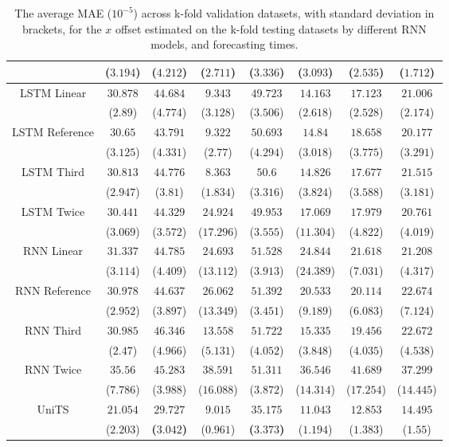 \begin{table}[!ht]
{\begin{tabular}{|c|c|c|c|c|c|c|c|}
			 & ($3.194$) & ($4.212$) & ($2.711$) & ($3.336$) & ($3.093$) & ($2.535$) & ($1.712$) \\ \hline
			\multirow{2}{*}{LSTM Linear} & $30.878$ & $44.684$ & $9.343$ & $49.723$ & $14.163$ & $17.123$ & $21.006$ \\
			 & ($2.89$) & ($4.774$) & ($3.128$) & ($3.506$) & ($2.618$) & ($2.528$) & ($2.174$) \\ \hline
			\multirow{2}{*}{LSTM Reference} & $30.65$ & $43.791$ & $9.322$ & $50.693$ & $14.84$ & $18.658$ & $20.177$ \\
			 & ($3.125$) & ($4.331$) & ($2.77$) & ($4.294$) & ($3.018$) & ($3.775$) & ($3.291$) \\ \hline
			\multirow{2}{*}{LSTM Third} & $30.813$ & $44.776$ & $8.363$ & $50.6$ & $14.826$ & $17.677$ & $21.515$ \\
			 & ($2.947$) & ($3.81$) & ($1.834$) & ($3.316$) & ($3.824$) & ($3.588$) & ($3.181$) \\ \hline
			\multirow{2}{*}{LSTM Twice} & $30.441$ & $44.329$ & $24.924$ & $49.953$ & $17.069$ & $17.979$ & $20.761$ \\
			 & ($3.069$) & ($3.572$) & ($17.296$) & ($3.555$) & ($11.304$) & ($4.822$) & ($4.019$) \\ \hline
			\multirow{2}{*}{RNN Linear} & $31.337$ & $44.785$ & $24.693$ & $51.528$ & $24.844$ & $21.618$ & $21.208$ \\
			 & ($3.114$) & ($4.409$) & ($13.112$) & ($3.913$) & ($24.389$) & ($7.031$) & ($4.317$) \\ \hline
			\multirow{2}{*}{RNN Reference} & $30.978$ & $44.637$ & $26.062$ & $51.392$ & $20.533$ & $20.114$ & $22.674$ \\
			 & ($2.952$) & ($3.897$) & ($13.349$) & ($3.451$) & ($9.189$) & ($6.083$) & ($7.124$) \\ \hline
			\multirow{2}{*}{RNN Third} & $30.985$ & $46.346$ & $13.558$ & $51.722$ & $15.335$ & $19.456$ & $22.672$ \\
			 & ($2.47$) & ($4.966$) & ($5.131$) & ($4.052$) & ($3.848$) & ($4.035$) & ($4.538$) \\ \hline
			\multirow{2}{*}{RNN Twice} & $35.56$ & $45.283$ & $38.591$ & $51.311$ & $36.546$ & $41.689$ & $37.299$ \\
			 & ($7.786$) & ($3.988$) & ($16.088$) & ($3.872$) & ($14.314$) & ($17.254$) & ($14.445$) \\ \hline
			\multirow{2}{*}{UniTS} & $21.054$ & $\mathbf{29.727}$ & $9.015$ & $\mathbf{35.175}$ & $11.043$ & $12.853$ & $14.495$ \\
			 & ($2.203$) & \textbf{(}$\mathbf{3.042}$\textbf{)} & ($0.961$) & \textbf{(}$\mathbf{3.373}$\textbf{)} & ($1.194$) & ($1.383$) & ($1.55$) \\ \hline
		\end{tabular}
	}
	\caption{The average MAE ($10^{-5}$) across k-fold validation datasets, with standard deviation in brackets, for the $x$ offset estimated on the k-fold testing datasets by different RNN models, and forecasting times.}
	\label{tab:all_longitude_no_abs_MAE}
\end{table}

